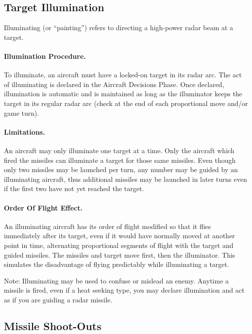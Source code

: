 \subsection{Target Illumination}

Illuminating (or “painting”) refers to directing a high-power radar beam at a target.

\paragraph{Illumination Procedure.} To illuminate, an aircraft must have a locked-on target in its radar arc. The act of illuminating is declared in the Aircraft Decisions Phase. Once declared, illumination is automatic and is maintained as long as the illuminator keeps the target in its regular radar arc (check at the end of each proportional move and/or game turn).

\paragraph{Limitations.} An aircraft may only illuminate one target at a time. Only the aircraft which fired the missiles can illuminate a target for those same missiles. Even though only two missiles may be launched per turn, any number may be guided by an illuminating aircraft, thus additional missiles may be launched in later turns even if the first two have not yet reached the target.

\paragraph{Order Of Flight Effect.} An illuminating aircraft has its order of flight modified so that it flies immediately after its target, even if it would have normally moved at another point in time, alternating proportional segments of flight with the target and guided missiles. The missiles and target move first, then the illuminator. This simulates the disadvantage of flying predictably while illuminating a target.

Note: Illuminating may be used to confuse or mislead an enemy. Anytime a missile is fired, even if a heat seeking type, you may declare illumination and act as if you are guiding a radar missile.

\subsection{Missile Shoot-Outs}

